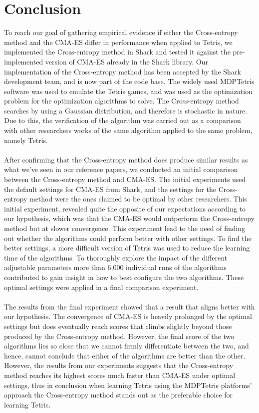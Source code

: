\section{Conclusion}

To reach our goal of gathering empirical evidence if either the Cross-entropy method
and the CMA-ES differ in performance when applied to Tetris, we implemented the Cross-entropy method in Shark and tested it against the pre-implemented version of CMA-ES
already in the Shark library. Our implementation of the Cross-entropy 
method has been accepted by the Shark development team, and is now part of the code base.
The widely used MDPTetris software was used to emulate the
Tetris games, and was used as the optimization problem for the optimization algorithms to solve.
The Cross-entropy method searches by using a Gaussian 
distribution, and therefore is stochastic in nature. Due to this, 
the verification of the algorithm was carried out as a comparison with other 
researchers works of the same algorithm applied to the same problem, namely Tetris.\\
\\
After confirming that the Cross-entropy method does produce similar results as 
what we've seen in our reference papers, we conducted an initial comparison between the
Cross-entropy method and CMA-ES. The initial experiments used the default settings for CMA-ES
from Shark,
and the settings for the Cross-entropy method were the ones claimed to be optimal by other 
researchers. This initial experiment, revealed quite the opposite of our expectations 
according to our hypothesis, which was that the CMA-ES would outperform the Cross-entropy method
but at slower convergence. This experiment lead to the need of finding out whether the algorithms
could perform better with other settings. To find the better settings, a more difficult version
of Tetris was used to reduce the learning time of the algorithms. To thoroughly explore 
the impact of the different adjustable parameters more than 6,000 individual runs of the 
algorithms contributed to gain insight in how to best configure the two algorithms. These 
optimal settings were applied in a final comparison experiment.\\
\\
The results from the final experiment showed that a result that aligns better with our
hypothesis. The convergence of CMA-ES is heavily prolonged by the optimal settings
but does eventually reach scores that climbs slightly beyond those produced by the
Cross-entropy method. However, the final score of the two algorithms lies so close that
we cannot firmly differentiate between the two, and hence, cannot conclude that either of the
algorithms are better than the other. However, the results from our experiments 
suggests that the Cross-entropy method reaches its 
highest scores much faster than CMA-ES under optimal settings, thus in conclusion
when learning Tetris using the MDPTetris platforms' approach the Cross-entropy method 
stands out as the preferable choice for learning Tetris.

